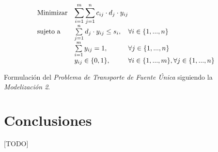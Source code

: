 \documentclass[a4paper, spanish]{article}
\begin{document}
      \begin{eqfloat}
        \begin{equation}
          \begin{array}{ll@{}ll}
            \text{Minimizar}	& \displaystyle \sum\limits_{i=1}^{m}\sum\limits_{j=1}^{n}c_{ij} \cdot d_{j} \cdot y_{ij} \\
            \text{sujeto a}		& \sum\limits_{j=1}^{n} d_{j} \cdot y_{ij}	\leq s_{i}, & \forall i \in \{1,...,n\}\\
                              &	\sum\limits_{i=1}^{m} y_{ij}	= 1, & \forall j \in \{1,...,n\} \\
                              & y_{ij}	\in \{0, 1\}, 	& \forall i \in \{1,...,m\}, \forall j \in \{1,...,n\}
          \end{array}
        \end{equation}
        \caption{Formulación del \emph{Problema de Transporte de Fuente Única} siguiendo la \emph{Modelización 2}.}
        \label{eq:single-source-transportation-model-2}
      \end{eqfloat}

  \section{Conclusiones}
  \label{sec:conclusions}

    \paragraph{}
    [TODO]
\end{document}
